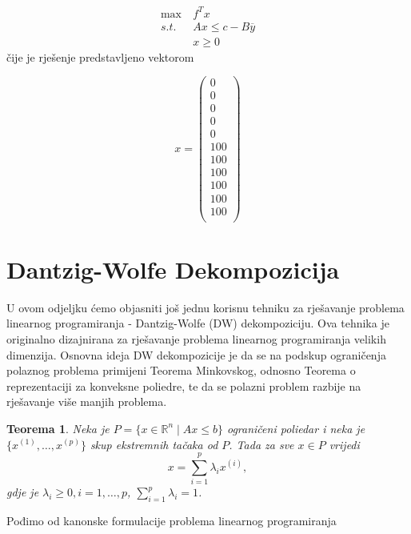\documentclass[a4paper, utf8, 11pt, colorlinks]{book}
\newtheorem{thm}{Teorema}
\begin{document}
 \begin{equation}\label{primer:formulacija3}
	\begin{aligned}
		\max\  &f^Tx\\
		s.t.\  &Ax\leqslant c-B\overline{y}\\
		&x\geqslant 0
	\end{aligned}
\end{equation}
čije je rješenje predstavljeno vektorom

$$x =\left(\begin{array}{c}
	0\\
	0\\
	0\\
	0\\
	0\\
	100\\
	100\\
	100\\
	100\\
	100\\
	100\\
\end{array}\right)$$



  \section{Dantzig-Wolfe Dekompozicija}%
 
 U ovom odjeljku ćemo objasniti još jednu korisnu tehniku za rješavanje problema linearnog programiranja - Dantzig-Wolfe (DW) dekompoziciju. Ova tehnika je originalno dizajnirana za rješavanje problema linearnog programiranja velikih dimenzija. Osnovna ideja DW dekompozicije je da se na podskup ograničenja polaznog problema primijeni Teorema Minkovskog, odnosno Teorema o reprezentaciji za konveksne poliedre, te da se polazni problem razbije na rješavanje više manjih problema.
 
 \begin{thm}
 	Neka je $P = \{ x \in \mathbb{R}^n \mid Ax \leq b\}$ ograničeni poliedar i neka je $\{x^{(1)}, \ldots, x^{(p)} \}$ skup ekstremnih tačaka od $P$. Tada za sve $x \in P$ vrijedi 
 	 $$ x = \sum_{i=1}^p \lambda_i x^{(i)},$$ 
 	 gdje je $\lambda_i \geq 0,i=1,\ldots,p$, $\sum_{i=1}^p \lambda_i=1$.
 \end{thm}
 
 Pođimo od kanonske formulacije problema linearnog programiranja
 
\end{document}

